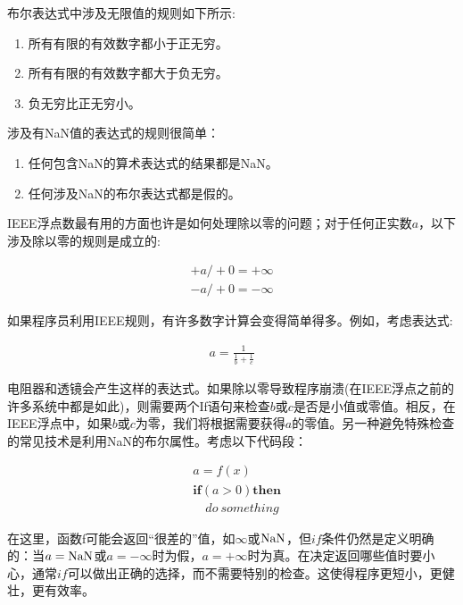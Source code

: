 布尔表达式中涉及无限值的规则如下所示:

\begin{enumerate}
	\item 所有有限的有效数字都小于正无穷。
	\item 所有有限的有效数字都大于负无穷。
	\item 负无穷比正无穷小。
\end{enumerate}

涉及有NaN值的表达式的规则很简单：

\begin{enumerate}
	\item 任何包含NaN的算术表达式的结果都是NaN。
	
	\item 任何涉及NaN的布尔表达式都是假的。
\end{enumerate}

IEEE浮点数最有用的方面也许是如何处理除以零的问题；对于任何正实数$a$，以下涉及除以零的规则是成立的:

\begin{equation}
	\begin{aligned}	
		+a/+0=+	\infty\\
		-a/+0=-	\infty
	\end{aligned}
\nonumber
\end{equation}

如果程序员利用IEEE规则，有许多数字计算会变得简单得多。例如，考虑表达式:

\begin{equation}\label{key}
	\begin{aligned}	
		a=\frac{1}{\frac{1}{b}+\frac{1}{c}}
	\end{aligned}
\nonumber
\end{equation}

电阻器和透镜会产生这样的表达式。如果除以零导致程序崩溃(在IEEE浮点之前的许多系统中都是如此)，则需要两个If语句来检查$b$或$c$是否是小值或零值。相反，在IEEE浮点中，如果$b$或$c$为零，我们将根据需要获得$a$的零值。另一种避免特殊检查的常见技术是利用NaN的布尔属性。考虑以下代码段：

\begin{equation}\label{key}
	\begin{aligned}	
		&a=f(x)\\
		&\mathbf{if}(a>0)\mathbf{then}\\
		&\quad do \: something
	\end{aligned}
\nonumber
\end{equation}

在这里，函数f可能会返回“很差的”值，如$\infty$或$\rm NaN$，但$if$条件仍然是定义明确的：当$a=\rm NaN$或$a=-\infty$时为假，$a=+\infty$时为真。在决定返回哪些值时要小心，通常$if$可以做出正确的选择，而不需要特别的检查。这使得程序更短小，更健壮，更有效率。

